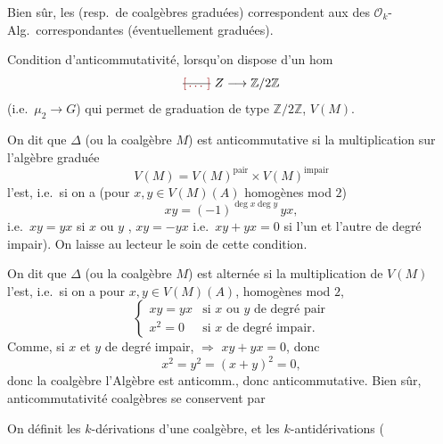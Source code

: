 \documentclass[11pt,a4paper]{article}
\begin{document}
Bien sûr, les \ill{} (resp.\ de coalgèbres graduées) correspondent aux \ill{} des $\mathcal{O}_k$-Alg.\ correspondantes (éventuellement graduées).

Condition d'anticommutativité, lorsqu'on dispose d'un hom
\[
  \text{\struck{\ill{}}}\ Z \longrightarrow \mathbb{Z}/2\mathbb{Z}
\]
(i.e.\ $\mu_2 \to G$) qui permet de \struck{\ill{}}  graduation de type $\mathbb{Z}/2\mathbb{Z}$,  $V(M)$.

On dit  que $\Delta$ (ou la coalgèbre $M$) est anticommutative si \struck{\ill{}} la multiplication sur  l'algèbre graduée 
\[
  V(M) = V(M)^{\mathrm{pair}} \times V(M)^{\mathrm{impair}}
\]
l'est, i.e.\ si on a (pour $x, y \in V(M)(A)$ homogènes mod $2$)
\[
  xy = (-1)^{\deg x \deg y}\, yx ,
\]
i.e.\ $xy = yx$ si $x$ ou $y$  \struck{\ill{}},  $xy = -yx$ i.e.\ $xy + yx = 0$ si l'un et l'autre de degré impair). On laisse au lecteur le soin de  cette condition.

On dit que $\Delta$ (ou la coalgèbre $M$) est alternée si la multiplication de $V(M)$ l'est, i.e.\ si on a pour \struck{\ill{}} $x, y \in V(M)(A)$, homogènes mod $2$, \struck{\ill{}}
\[
  \begin{cases}
    xy = yx & \text{si } x \text{ ou } y \text{ de degré pair}  \\
    x^2 = 0 & \text{si } x \text{ de degré impair.}
  \end{cases}
\]
Comme, si $x$ et $y$ de degré impair,  $\Rightarrow$ $xy + yx = 0$, donc
\[
  x^2 = y^2 = (x+y)^2 = 0 ,
\]
\ill{} donc \add{\ill{}} la coalgèbre  \ill{} l'Algèbre est anticomm., donc \ill{} anticommutative. Bien sûr,  anticommutativité  \struck{\ill{}} \add{\ill{}}  \struck{\ill{}} \ill{} coalgèbres se conservent par 

On définit les $k$-dérivations d'une coalgèbre, et les $k$-antidérivations (
\end{document}
